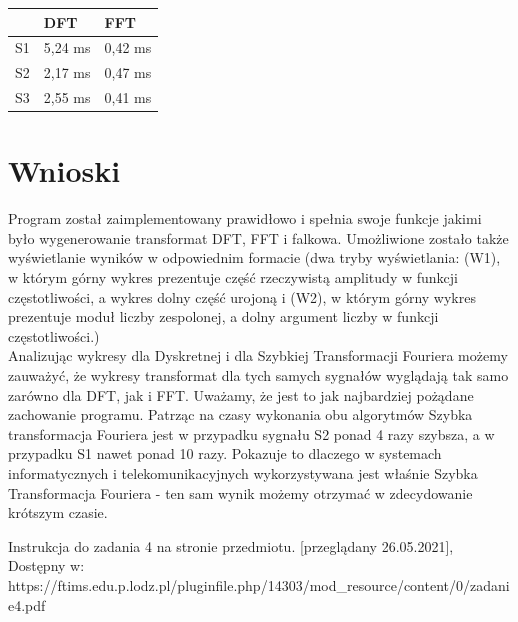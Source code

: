 \documentclass[12pt]{article}
\begin{document}
\begin{table}[H]
\centering
\begin{tabular}{|l|l|l|}
\hline
   & DFT     & FFT     \\ \hline
S1 & 5,24 ms & 0,42 ms \\ \hline
S2 & 2,17 ms & 0,47 ms \\ \hline
S3 & 2,55 ms & 0,41 ms \\ \hline
\end{tabular}
\end{table}

\section{Wnioski}
\indent
\indent Program został zaimplementowany prawidłowo i spełnia swoje funkcje jakimi było wygenerowanie transformat DFT, FFT i falkowa. Umożliwione zostało także wyświetlanie wyników w odpowiednim formacie (dwa tryby wyświetlania: (W1), w którym górny wykres prezentuje część rzeczywistą amplitudy w funkcji częstotliwości, a wykres dolny część urojoną i (W2), w którym górny wykres prezentuje moduł liczby zespolonej, a dolny argument liczby w funkcji częstotliwości.)\\

\indent Analizując wykresy dla Dyskretnej i dla Szybkiej Transformacji Fouriera możemy zauważyć, że wykresy transformat dla tych samych sygnałów wyglądają tak samo zarówno dla DFT, jak i FFT. Uważamy, że jest to jak najbardziej pożądane zachowanie programu. Patrząc na czasy wykonania obu algorytmów Szybka transformacja Fouriera jest w przypadku sygnału S2 ponad 4 razy szybsza, a w przypadku S1 nawet ponad 10 razy. Pokazuje to dlaczego w systemach informatycznych i telekomunikacyjnych wykorzystywana jest właśnie Szybka Transformacja Fouriera - ten sam wynik możemy otrzymać w zdecydowanie krótszym czasie.

\begin{thebibliography}{}
 Instrukcja do zadania 4 na stronie przedmiotu. [przeglądany 26.05.2021], Dostępny w: https://ftims.edu.p.lodz.pl/pluginfile.php/14303/mod\_resource/content/0/zadanie4.pdf


\end{thebibliography}
\end{document}

